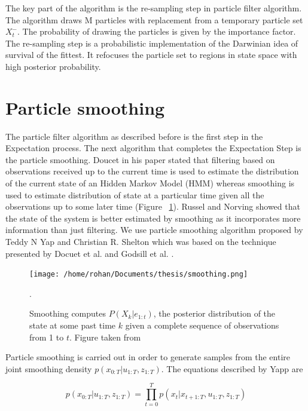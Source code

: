 \documentclass[12pt]{dalcsthesis}
\begin{document}
The key part of the algorithm is the re-sampling step in particle filter algorithm. The algorithm draws M particles with replacement from a temporary particle set $X_{t}^{-}$. The probability of drawing the particles is given by the importance factor. The re-sampling step is a probabilistic implementation of the Darwinian idea of survival of the fittest. It refocuses the particle set to regions in state space with high posterior probability. 

\section{Particle smoothing}
\label{ch-: particle smoothing}
The particle filter algorithm as described before is the first step in the Expectation process. The next algorithm that completes the Expectation Step is the particle smoothing. Doucet \cite{doucet2009tutorial} in his paper stated that filtering based on observations received up to the current time is used to estimate the distribution of the current state of an Hidden Markov Model (HMM) whereas smoothing is used to estimate distribution of state at a particular time given all the observations up to some later time (Figure ~\ref{fig: particle smoothing}). Russel and Norving \cite{russell2003artificial} showed that the state of the system is better estimated by smoothing as it incorporates more information than just filtering. We use particle smoothing algorithm proposed by Teddy N Yap and Christian R. Shelton \cite{Yap2008} which was based on the technique presented by Docuet et al. \cite{doucet2000monte} and Godsill et al. \cite{Godsill2004}.
\begin{figure}
\centering
{\texttt{[image: /home/rohan/Documents/thesis/smoothing.png]}}

\caption{\label{fig: particle smoothing} Smoothing computes $P(X_{k}|e_{1:t})$, the posterior distribution of the state at some past time $k$ given a complete sequence of observations from 1 to $t$. Figure taken from \cite{russell2003artificial}}.
\end{figure}

Particle smoothing is carried out in order to generate samples from the entire joint smoothing density $p(x_{0:T}|u_{1:T},z_{1:T})$. 
The equations described by Yapp \cite{Yap2008} are

\begin{equation}
p(x_{0:T}|u_{1:T},z_{1:T})=\prod_{t=0}^{T}p(x_{t}|x_{t+1:T},u_{1:T},z_{1:T})
\end{equation}
\end{document}
